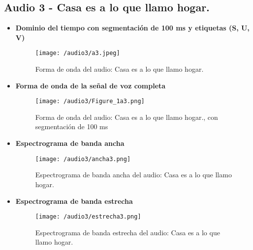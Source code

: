 \documentclass{report}
\begin{document}
\subsection{Audio 3 - Casa es a lo que llamo hogar.}
\begin{itemize}
    \item \textbf{Dominio del tiempo con segmentación de 100 ms y etiquetas (S, U, V)}
    \begin{figure}[h]
        \centering
        \texttt{[image: /audio3/a3.jpeg]}
        \caption{Forma de onda del audio: Casa es a lo que llamo hogar.}
        \label{fig:forma_onda_audio3div}
    \end{figure}
    \item \textbf{Forma de onda de la señal de voz completa}
    \begin{figure}[h]
        \centering
        \texttt{[image: /audio3/Figure\_1a3.png]}
        \caption{Forma de onda del audio: Casa es a lo que llamo hogar., con segmentación de 100 ms}
        \label{fig:forma de onda_audio3}
    \end{figure}
    \newpage
    \item \textbf{Espectrograma de banda ancha}
    \begin{figure}[h]
        \centering
        \texttt{[image: /audio3/ancha3.png]}
        \caption{Espectrograma de banda ancha del audio: Casa es a lo que llamo hogar.}
        \label{fig:espectograma banda ancha audio3}
    \end{figure}
    \item \textbf{Espectrograma de banda estrecha}
    \begin{figure}[h]
        \centering
        \texttt{[image: /audio3/estrecha3.png]}
        \caption{Espectrograma de banda estrecha del audio: Casa es a lo que llamo hogar.}
        \label{fig:espectograma banda estrecha audio3}
    \end{figure}
\end{itemize}

\newpage
\end{document}
